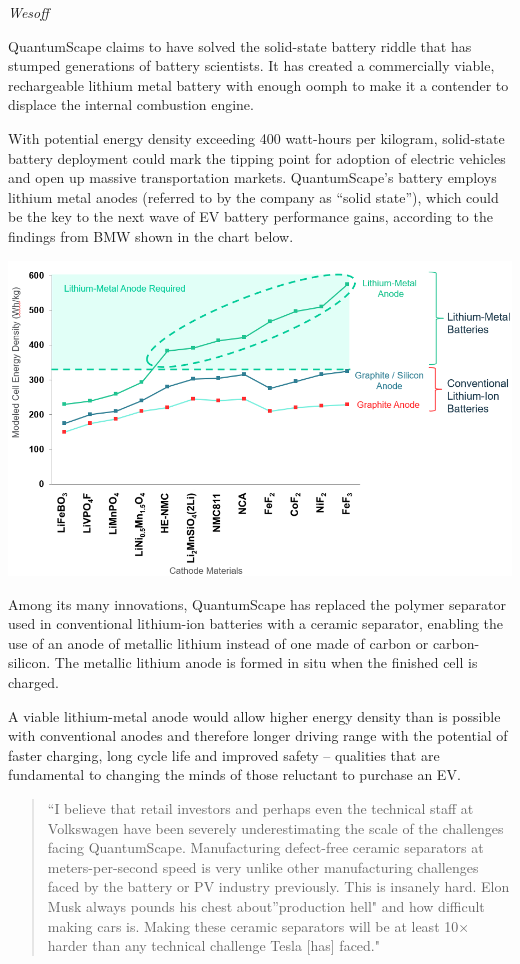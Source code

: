 \documentclass[
]{book}
\begin{document}
\emph{Wesoff}

QuantumScape claims to have solved the solid-state battery riddle that has stumped generations of battery scientists. It has created a commercially viable, rechargeable lithium metal battery with enough oomph to make it a contender to displace the internal combustion engine.

With potential energy density exceeding 400 watt-hours per kilogram, solid-state battery deployment could mark the tipping point for adoption of electric vehicles and open up massive transportation markets. QuantumScape's battery employs lithium metal anodes (referred to by the company as ``solid state''), which could be the key to the next wave of EV battery performance gains, according to the findings from BMW shown in the chart below.

\includegraphics{fig/cathode-anode-materials-chart.png}

Among its many innovations, QuantumScape has replaced the polymer separator used in conventional lithium-ion batteries with a ceramic separator, enabling the use of an anode of metallic lithium instead of one made of carbon or carbon-silicon. The metallic lithium anode is formed in situ when the finished cell is charged.

A viable lithium-metal anode would allow higher energy density than is possible with conventional anodes and therefore longer driving range with the potential of faster charging, long cycle life and improved safety -- qualities that are fundamental to changing the minds of those reluctant to purchase an EV.

\begin{quote}
``I believe that retail investors and perhaps even the technical staff at Volkswagen have been severely underestimating the scale of the challenges facing QuantumScape. Manufacturing defect-free ceramic separators at meters-per-second speed is very unlike other manufacturing challenges faced by the battery or PV industry previously. This is insanely hard. Elon Musk always pounds his chest about''production hell" and how difficult making cars is. Making these ceramic separators will be at least 10× harder than any technical challenge Tesla {[}has{]} faced."
\end{quote}
\end{document}
